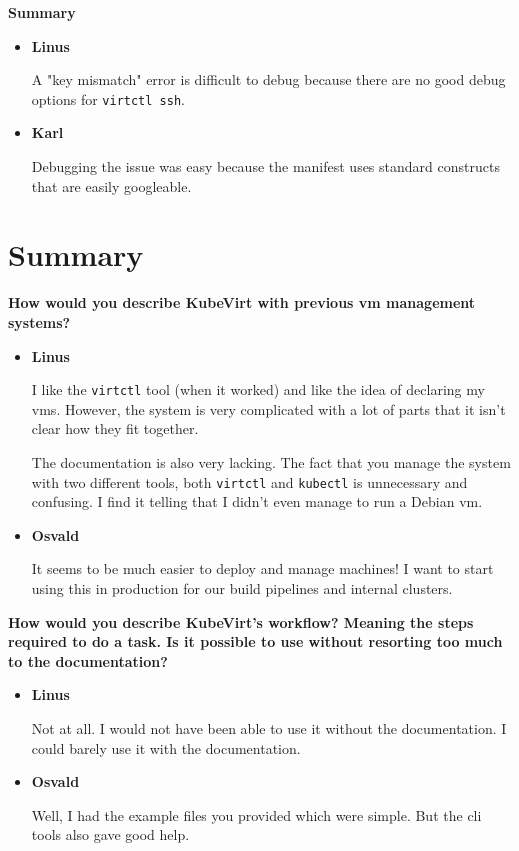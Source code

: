 \documentclass{kththesis}
\begin{document}
\begin{enumerate}
\noindent \textbf{Summary}
\begin{itemize}
\item \textbf{Linus}

A "key mismatch" error is difficult to debug because there are no good debug options for \texttt{virtctl ssh}.

\item \textbf{Karl}

Debugging the issue was easy because the manifest uses standard constructs that are easily googleable.
\end{itemize}

\section{Summary}
\noindent \textbf{How would you describe KubeVirt with previous \Gls{vm} management systems?}
\begin{itemize}
\item \textbf{Linus}

I like the \texttt{virtctl} tool (when it worked) and like the idea of declaring my \Glspl{vm}. However, the system is very complicated with a lot of parts that it isn't clear how they fit together.

The documentation is also very lacking. The fact that you manage the system with two different tools, both \texttt{virtctl} and \texttt{kubectl} is unnecessary and confusing. I find it telling that  I didn't even manage to run a Debian \Gls{vm}.

\item \textbf{Osvald}

It seems to be much easier to deploy and manage machines! I want to start using this in production for our build pipelines and internal clusters.
\end{itemize}

\noindent \textbf{How would you describe KubeVirt's workflow? Meaning the steps required to do a task. Is it possible to use without resorting too much to the documentation?}
\begin{itemize}
\item \textbf{Linus}

Not at all. I would not have been able to use it without the documentation. I could barely use it with the documentation.

\item \textbf{Osvald}

Well, I had the example files you provided which were simple. But the \Gls{cli} tools also gave good help.
\end{itemize}


\end{enumerate}
\end{document}
